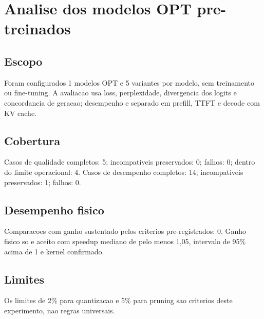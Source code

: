 \chapter{Analise dos modelos OPT pre-treinados}
\section{Escopo}
Foram configurados 1 modelos OPT e 5 variantes por modelo, sem treinamento ou fine-tuning.
A avaliacao usa loss, perplexidade, divergencia dos logits e concordancia de geracao; desempenho e separado em prefill, TTFT e decode com KV cache.
\section{Cobertura}
Casos de qualidade completos: 5; incompativeis preservados: 0; falhos: 0; dentro do limite operacional: 4.
Casos de desempenho completos: 14; incompativeis preservados: 1; falhos: 0.
\section{Desempenho fisico}
Comparacoes com ganho sustentado pelos criterios pre-registrados: 0.
Ganho fisico so e aceito com speedup mediano de pelo menos 1,05, intervalo de 95\% acima de 1 e kernel confirmado.
\section{Limites}
Os limites de 2\% para quantizacao e 5\% para pruning sao criterios deste experimento, nao regras universais.
